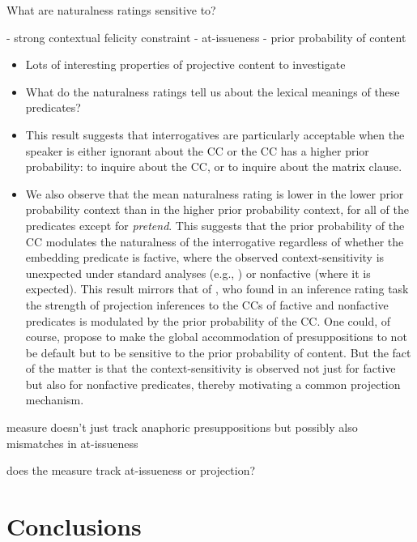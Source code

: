 \documentclass[11pt,fleqn]{article}
\newcommand{\6}{\mbox{$[\hspace*{-.6mm}[$}}
\newcommand{\9}{\mbox{$]\hspace*{-.6mm}]$}}
\begin{document}
What are naturalness ratings sensitive to?


- strong contextual felicity constraint
- at-issueness
- prior probability of content

\begin{itemize}

\item Lots of interesting properties of projective content to investigate

\item What do the naturalness ratings tell us about the lexical meanings of these predicates?


\item This result suggests that interrogatives are particularly acceptable when the speaker is either ignorant about the CC or the CC has a higher prior probability: to inquire about the CC, or to inquire about the matrix clause. 

\item We also observe that the mean naturalness rating is lower in the lower prior probability context than in the higher prior probability context, for all of the predicates except for {\em pretend}. This suggests that the prior probability of the CC modulates the naturalness of the interrogative regardless of whether the embedding predicate is factive, where the observed context-sensitivity is unexpected under standard analyses (e.g., \citealt{heim83,vds92}) or nonfactive (where it is expected). This result mirrors that of \citealt{degen-tonhauser-openmind}, who found in an inference rating task the strength of projection inferences to the CCs of factive and nonfactive predicates is modulated by the prior probability of the CC. One could, of course, propose to make the global accommodation of presuppositions to not be default but to be sensitive to the prior probability of content. But the fact of the matter is that the context-sensitivity is observed not just for factive but also for nonfactive predicates, thereby motivating a common projection mechanism.

\end{itemize}

measure doesn't just track anaphoric presuppositions but possibly also mismatches in at-issueness

does the measure track at-issueness or projection?

\section{Conclusions}\label{s4}
\end{document}
